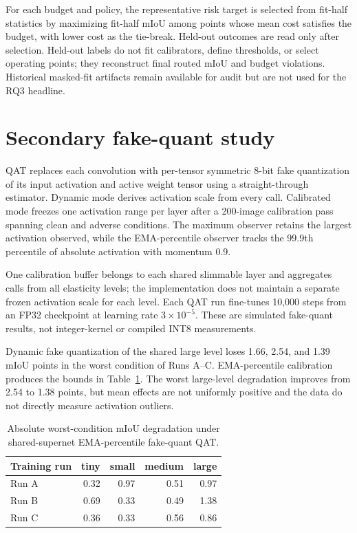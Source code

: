 \documentclass[a4paper,review,12pt]{elsarticle}
\newcommand{\miou}{mIoU}
\begin{document}
For each budget and policy, the representative risk target is selected from fit-half statistics by maximizing fit-half \miou{} among points whose mean cost satisfies the budget, with lower cost as the tie-break. Held-out outcomes are read only after selection. Held-out labels do not fit calibrators, define thresholds, or select operating points; they reconstruct final routed \miou{} and budget violations. Historical masked-fit artifacts remain available for audit but are not used for the RQ3 headline.

\section{Secondary fake-quant study}

QAT replaces each convolution with per-tensor symmetric 8-bit fake quantization of its input activation and active weight tensor using a straight-through estimator. Dynamic mode derives activation scale from every call. Calibrated mode freezes one activation range per layer after a 200-image calibration pass spanning clean and adverse conditions. The maximum observer retains the largest activation observed, while the EMA-percentile observer tracks the 99.9th percentile of absolute activation with momentum 0.9.

One calibration buffer belongs to each shared slimmable layer and aggregates calls from all elasticity levels; the implementation does not maintain a separate frozen activation scale for each level. Each QAT run fine-tunes 10,000 steps from an FP32 checkpoint at learning rate $3\times10^{-5}$. These are simulated fake-quant results, not integer-kernel or compiled INT8 measurements.

Dynamic fake quantization of the shared large level loses 1.66, 2.54, and 1.39 \miou{} points in the worst condition of Runs A--C. EMA-percentile calibration produces the bounds in Table~\ref{tab:qat}. The worst large-level degradation improves from 2.54 to 1.38 points, but mean effects are not uniformly positive and the data do not directly measure activation outliers.

\begin{table}[H]
\centering
\caption{Absolute worst-condition \miou{} degradation under shared-supernet EMA-percentile fake-quant QAT.}
\label{tab:qat}
\begin{tabular}{@{}lrrrr@{}}
\toprule
Training run & tiny & small & medium & large \\
\midrule
Run A & 0.32 & 0.97 & 0.51 & 0.97 \\
Run B & 0.69 & 0.33 & 0.49 & 1.38 \\
Run C & 0.36 & 0.33 & 0.56 & 0.86 \\
\bottomrule
\end{tabular}
\end{table}
\end{document}
